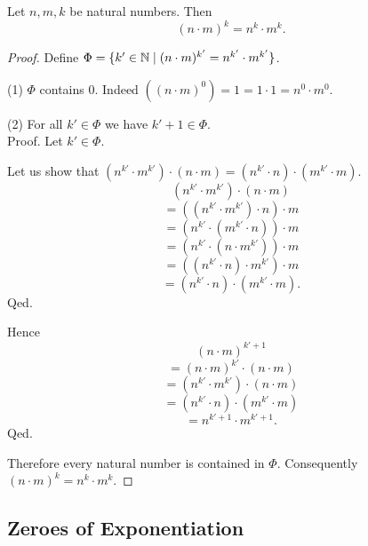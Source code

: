 \documentclass[10pt]{article}
\begin{document}
  \begin{forthel}
    \begin{proposition}
      Let $n, m, k$ be natural numbers.
      Then \[ (n \cdot m)^{k} = n^{k} \cdot m^{k}. \]
    \end{proposition}
    \begin{proof}
      Define $\Phi = \{ k' \in \mathbb{N} \mid (n \cdot m)^{k'} =
      n^{k'} \cdot m^{k'} \}$.

      (1) $\Phi$ contains $0$.
      Indeed $((n \cdot m)^{0})
        = 1
        = 1 \cdot 1
        = n^{0} \cdot m^{0}$. %

      (2) For all $k' \in \Phi$ we have $k' + 1 \in \Phi$. \\
      Proof.
        Let $k' \in \Phi$.

        Let us show that $(n^{k'} \cdot m^{k'}) \cdot (n \cdot m) =
        (n^{k'} \cdot n) \cdot (m^{k'} \cdot m)$.
          \[  (n^{k'} \cdot m^{k'}) \cdot (n \cdot m)       \]
          \[    = ((n^{k'} \cdot m^{k'}) \cdot n) \cdot m   \]
          \[    = (n^{k'} \cdot (m^{k'} \cdot n)) \cdot m   \]
          \[    = (n^{k'} \cdot (n \cdot m^{k'})) \cdot m   \]
          \[    = ((n^{k'} \cdot n) \cdot m^{k'}) \cdot m   \]
          \[    = (n^{k'} \cdot n) \cdot (m^{k'} \cdot m).  \]
        Qed.

        Hence
        \[  (n \cdot m)^{k' + 1}                          \]
        \[    = (n \cdot m)^{k'} \cdot (n \cdot m)        \]
        \[    = (n^{k'} \cdot m^{k'}) \cdot (n \cdot m)   \]
        \[    = (n^{k'} \cdot n) \cdot (m^{k'} \cdot m)   \]
        \[    = n^{k' + 1} \cdot m^{k' + 1}.              \]
      Qed.

      Therefore every natural number is contained in $\Phi$.
      Consequently $(n \cdot m)^{k} = n^{k} \cdot m^{k}$.
    \end{proof}
  \end{forthel}


  \subsection{Zeroes of Exponentiation}
\end{document}
